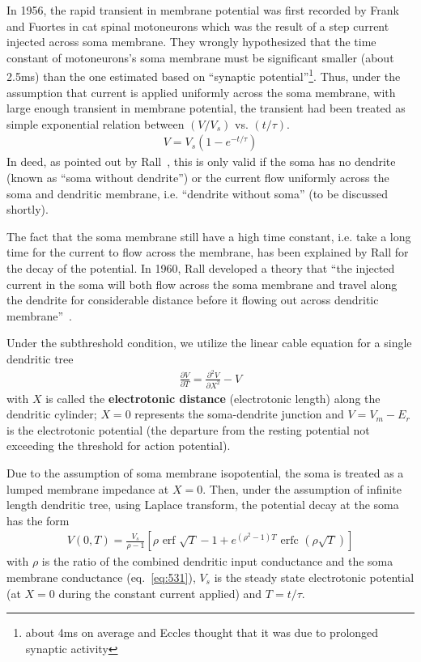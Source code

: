 In 1956, the rapid transient in membrane potential was first recorded
by Frank and Fuortes \cite{frank1956ssm} in cat spinal motoneurons
which was the result of a step current injected across soma membrane.
They wrongly hypothesized that the time constant of motoneurons's soma
membrane must be significant smaller (about 2.5ms) than the one
estimated based on ``synaptic
potential''\footnote{about 4ms on average and Eccles thought that it
  was due to prolonged synaptic activity}.
Thus, under the assumption that current is applied uniformly across
the soma membrane, with large enough transient in membrane potential,
the transient had been treated as simple exponential relation between
$(V/V_s)$ vs. $(t/\tau)$.
\begin{eqnarray}
  \label{eq:548}
  V =V_s (1-e^{-t/\tau})
\end{eqnarray}
In deed, as pointed out by Rall~\cite{rall1957mtc}, this is only valid
if the soma has no dendrite (known as ``soma without dendrite'') or
the current flow uniformly across the soma and dendritic membrane,
i.e. ``dendrite without soma'' (to be discussed shortly).

The fact that the soma membrane still have a high time constant,
i.e. take a long time for the current to flow across the membrane, has
been explained by Rall for the decay of the potential.  In 1960, Rall
developed a theory that ``the injected current in the soma will both
flow across the soma membrane and travel along the dendrite for
considerable distance before it flowing out across dendritic
membrane''~\cite{rall1960mpt}.

Under the subthreshold condition, we utilize the linear cable equation
for a single dendritic tree
\begin{eqnarray}
  \label{eq:452}
     \frac{\partial V}{\partial T}  =
   \frac{\partial^2V}{\partial X^2} - V
\end{eqnarray}
with $X$ is called the {\bf electrotonic distance} (electrotonic
length) along the dendritic cylinder; $X=0$ represents the
soma-dendrite junction and $V=V_m-E_r$ is the electrotonic potential
(the departure from the resting potential not exceeding the threshold
for action potential). 

Due to the assumption of soma membrane isopotential, the soma is
treated as a lumped membrane impedance at $X=0$.  Then, under the
assumption of infinite length dendritic tree, using Laplace transform,
the potential decay at the soma has the form
\begin{eqnarray}
  \label{eq:453}
  V(0,T) = \frac{V_s}{\rho-1}\left[ \rho \text{ erf
    }\sqrt{T}-1+e^{(\rho^2-1)T}\text{ erfc }(\rho \sqrt{T})\right]
\end{eqnarray}
with $\rho$ is the ratio of the combined dendritic input conductance
and the soma membrane conductance (eq.~\eqref{eq:531}), $V_s$ is the
steady state electrotonic potential (at $X=0$ during the constant
current applied) and $T=t/\tau$.

